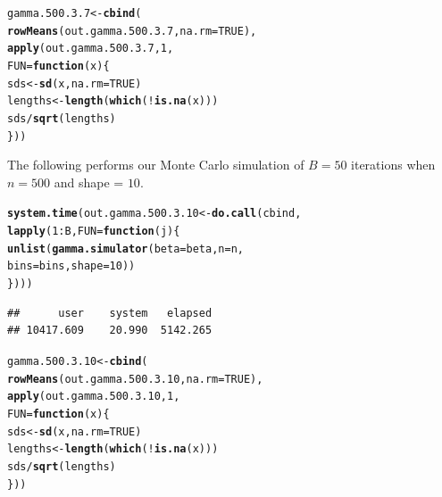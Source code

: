\documentclass[11pt]{article}\usepackage[]{graphicx}\usepackage[]{color}
\makeatletter
\newcommand{\hlnum}[1]{\textcolor[rgb]{0.686,0.059,0.569}{#1}}%
\newcommand{\hlopt}[1]{\textcolor[rgb]{0,0,0}{#1}}%
\newcommand{\hlstd}[1]{\textcolor[rgb]{0.345,0.345,0.345}{#1}}%
\newcommand{\hlkwa}[1]{\textcolor[rgb]{0.161,0.373,0.58}{\textbf{#1}}}%
\newcommand{\hlkwb}[1]{\textcolor[rgb]{0.69,0.353,0.396}{#1}}%
\newcommand{\hlkwc}[1]{\textcolor[rgb]{0.333,0.667,0.333}{#1}}%
\newcommand{\hlkwd}[1]{\textcolor[rgb]{0.737,0.353,0.396}{\textbf{#1}}}%
\newenvironment{kframe}{%
 \def\at@end@of@kframe{}%
 \ifinner\ifhmode%
  \def\at@end@of@kframe{\end{minipage}}%
  \begin{minipage}{\columnwidth}%
 \fi\fi%
 \def\FrameCommand##1{\hskip\@totalleftmargin \hskip-\fboxsep
 \colorbox{shadecolor}{##1}\hskip-\fboxsep
     \hskip-\linewidth \hskip-\@totalleftmargin \hskip\columnwidth}%
 \MakeFramed {\advance\hsize-\width
   \@totalleftmargin\z@ \linewidth\hsize
   \@setminipage}}%
 {\par\unskip\endMakeFramed%
 \at@end@of@kframe}
\newenvironment{knitrout}{}{} %
\makeatother
\begin{document}
\begin{knitrout}
\color{fgcolor}\begin{kframe}
\begin{alltt}
\hlstd{gamma.500.3.7} \hlkwb{<-} \hlkwd{cbind}\hlstd{(}
  \hlkwd{rowMeans}\hlstd{(out.gamma.500.3.7,} \hlkwc{na.rm} \hlstd{=} \hlnum{TRUE}\hlstd{),}
  \hlkwd{apply}\hlstd{(out.gamma.500.3.7,} \hlnum{1}\hlstd{,}
  \hlkwc{FUN} \hlstd{=} \hlkwa{function}\hlstd{(}\hlkwc{x}\hlstd{)\{}
    \hlstd{sds} \hlkwb{<-} \hlkwd{sd}\hlstd{(x,} \hlkwc{na.rm} \hlstd{=} \hlnum{TRUE}\hlstd{)}
    \hlstd{lengths} \hlkwb{<-} \hlkwd{length}\hlstd{(}\hlkwd{which}\hlstd{(}\hlopt{!}\hlkwd{is.na}\hlstd{(x)))}
    \hlstd{sds} \hlopt{/} \hlkwd{sqrt}\hlstd{(lengths)}
  \hlstd{\}))}
\end{alltt}
\end{kframe}
\end{knitrout}

The following performs our Monte Carlo simulation of $B = 50$ iterations 
when $n = 500$ and shape = $10$.

\begin{knitrout}
\color{fgcolor}\begin{kframe}
\begin{alltt}
\hlkwd{system.time}\hlstd{(out.gamma.500.3.10} \hlkwb{<-} \hlkwd{do.call}\hlstd{(cbind,}
  \hlkwd{lapply}\hlstd{(}\hlnum{1}\hlopt{:}\hlstd{B,} \hlkwc{FUN} \hlstd{=} \hlkwa{function}\hlstd{(}\hlkwc{j}\hlstd{)\{}
    \hlkwd{unlist}\hlstd{(}\hlkwd{gamma.simulator}\hlstd{(}\hlkwc{beta} \hlstd{= beta,} \hlkwc{n} \hlstd{= n,}
      \hlkwc{bins} \hlstd{= bins,} \hlkwc{shape} \hlstd{=} \hlnum{10}\hlstd{))}
\hlstd{\})))}
\end{alltt}
\begin{verbatim}
##      user    system   elapsed 
## 10417.609    20.990  5142.265
\end{verbatim}
\end{kframe}
\end{knitrout}

\begin{knitrout}
\color{fgcolor}\begin{kframe}
\begin{alltt}
\hlstd{gamma.500.3.10} \hlkwb{<-} \hlkwd{cbind}\hlstd{(}
  \hlkwd{rowMeans}\hlstd{(out.gamma.500.3.10,} \hlkwc{na.rm} \hlstd{=} \hlnum{TRUE}\hlstd{),}
  \hlkwd{apply}\hlstd{(out.gamma.500.3.10,} \hlnum{1}\hlstd{,}
  \hlkwc{FUN} \hlstd{=} \hlkwa{function}\hlstd{(}\hlkwc{x}\hlstd{)\{}
    \hlstd{sds} \hlkwb{<-} \hlkwd{sd}\hlstd{(x,} \hlkwc{na.rm} \hlstd{=} \hlnum{TRUE}\hlstd{)}
    \hlstd{lengths} \hlkwb{<-} \hlkwd{length}\hlstd{(}\hlkwd{which}\hlstd{(}\hlopt{!}\hlkwd{is.na}\hlstd{(x)))}
    \hlstd{sds} \hlopt{/} \hlkwd{sqrt}\hlstd{(lengths)}
  \hlstd{\}))}
\end{alltt}
\end{kframe}
\end{knitrout}
\end{document}
